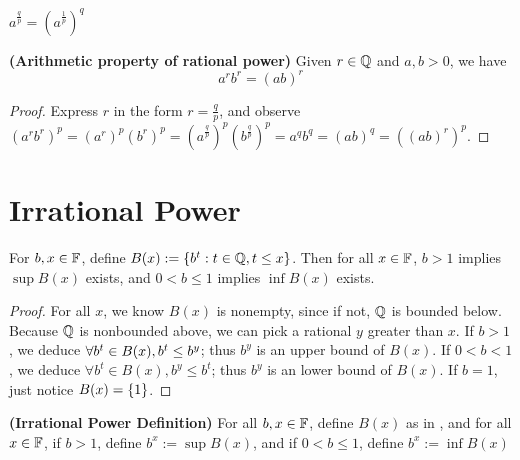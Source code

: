 \documentclass{report}
\begin{document}
\begin{corollary}
\label{1.3.14}
$a^{\frac{q}{p}}=(a^{\frac{1}{p}})^q$
\end{corollary}
\begin{theorem}
\label{1.3.15}
\textbf{(Arithmetic property of rational power)} Given $r\in\mathbb{Q}$ and $a,b>0$, we have
 \begin{equation}
a^rb^r=(ab)^r
\end{equation}
\end{theorem}
\begin{proof}
Express $r$ in the form  $r=\frac{q}{p}$, and observe $(a^rb^r)^p=(a^r)^p(b^r)^p=(a^{\frac{q}{p}})^p(b^{\frac{q}{p}})^p=a^qb^q=(ab)^q=((ab)^r)^p$. 
\end{proof}
\section{Irrational Power}
\begin{lemma}
\label{1.4.1}
For $b,x\in\mathbb{F}$, define  $B(x):=\{ b^t:t\in\mathbb{Q},t\leq x \}$. Then for all $x\in\mathbb{F}$, $b>1$ implies  $\sup B(x)$ exists, and $0<b\leq 1$ implies $\inf B(x)$ exists.
\end{lemma}
\begin{proof}
  For all $x$,  we know $B(x)$ is nonempty, since if not, $\mathbb{Q}$ is bounded below. Because $\mathbb{Q}$ is nonbounded above, we can pick a rational  $y$ greater than $x$. If $b>1$, we deduce  $\forall b^t\in B(x),b^t\leq b^y $; thus $b^y$ is an upper bound of  $B(x)$. If $0<b<1$, we deduce $\forall b^t\in B(x),b^y\leq b^t$; thus $b^y$ is an lower bound of $B(x)$. If $b=1$, just notice  $B(x)=\{ 1 \}$.     
\end{proof}
\begin{definition}
\label{1.4.2}
\textbf{(Irrational Power Definition)} For all $b,x\in\mathbb{F}$, define $B(x)$ as in , and for all $x\in\mathbb{F}$, if $b>1$, define $b^x:=\sup B(x)$, and if $0<b\leq 1$, define $b^x:=\inf B(x)$ 
\end{definition}
\end{document}
